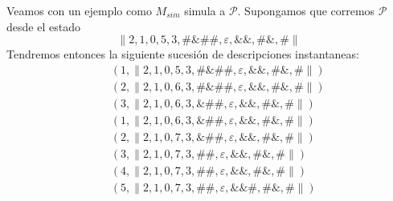 \begin{frame}
  \PN Veamos con un ejemplo como $M_{sim}$ simula a $\mathcal{P}$. Supongamos que corremos $\mathcal{P}$ desde el estado
  \begin{equation*}
    \lVert 2, 1, 0, 5, 3, \#\&\#\#, \varepsilon, \&\&, \#\&, \# \rVert
  \end{equation*}%
  \PN Tendremos entonces la siguiente sucesión de descripciones instantaneas:
  \begin{eqnarray*}
    && (1, \lVert 2, 1, 0, 5, 3, \#\&\#\#, \varepsilon, \&\&, \#\&, \# \rVert) \\[5pt]
    && (2, \lVert 2, 1, 0, 6, 3, \#\&\#\#, \varepsilon, \&\&, \#\&, \# \rVert) \\[5pt]
    && (3, \lVert 2, 1, 0, 6, 3, \&\#\#, \varepsilon, \&\&, \#\&, \# \rVert) \\[5pt]
    && (1, \lVert 2, 1, 0, 6, 3, \&\#\#, \varepsilon, \&\&, \#\&, \# \rVert) \\[5pt]
    && (2, \lVert 2, 1, 0, 7, 3, \&\#\#, \varepsilon, \&\&, \#\&, \# \rVert) \\[5pt]
    && (3, \lVert 2, 1, 0, 7, 3, \#\#, \varepsilon, \&\&, \#\&, \# \rVert) \\[5pt]
    && (4, \lVert 2, 1, 0, 7, 3, \#\#, \varepsilon, \&\&, \#\&, \# \rVert) \\[5pt]
    && (5, \lVert 2, 1, 0, 7, 3, \#\#, \varepsilon, \&\&\#, \#\&, \# \rVert)
  \end{eqnarray*}
\end{frame}
